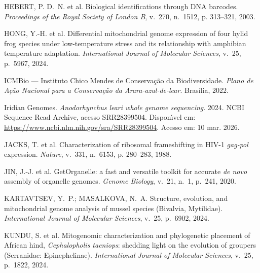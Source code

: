 \begin{thebibliography}{}
{HEBERT, P. D.~N. et al. Biological identifications through {DNA} barcodes.
\emph{Proceedings of the Royal Society of London B}, v.~270, n.~1512, p.
  313--321, 2003.}

{HONG, Y.-H. et al. Differential mitochondrial genome expression of four hylid
  frog species under low-temperature stress and its relationship with amphibian
  temperature adaptation.
\emph{International Journal of Molecular Sciences}, v.~25, p.~5967, 2024.}

{{ICMBio --- Instituto Chico Mendes de Conservação da Biodiversidade}.
  \emph{Plano de Ação Nacional para a Conservação da Arara-azul-de-lear}.
Brasília, 2022.}

{{Iridian Genomes}. \emph{\textit{Anodorhynchus leari} whole genome
  sequencing}. 2024. NCBI Sequence Read Archive, acesso SRR28399504.
Dispon{\'\i}vel em: \url{https://www.ncbi.nlm.nih.gov/sra/SRR28399504}. Acesso
  em: 10 mar. 2026.}

{JACKS, T. et al. Characterization of ribosomal frameshifting in {HIV-1}
  \textit{gag-pol} expression.
\emph{Nature}, v.~331, n.~6153, p. 280--283, 1988.}

{JIN, J.-J. et al. {GetOrganelle}: a fast and versatile toolkit for accurate
  \textit{de novo} assembly of organelle genomes.
\emph{Genome Biology}, v.~21, n.~1, p.~241, 2020.}

{KARTAVTSEV, Y.~P.; MASALKOVA, N.~A. Structure, evolution, and mitochondrial
  genome analysis of mussel species ({B}ivalvia, {M}ytilidae).
\emph{International Journal of Molecular Sciences}, v.~25, p.~6902, 2024.}

{KUNDU, S. et al. Mitogenomic characterization and phylogenetic placement of
  {A}frican hind, \textit{Cephalopholis taeniops}: shedding light on the
  evolution of groupers ({S}erranidae: {E}pinephelinae).
\emph{International Journal of Molecular Sciences}, v.~25, p.~1822, 2024.}


\end{thebibliography}
